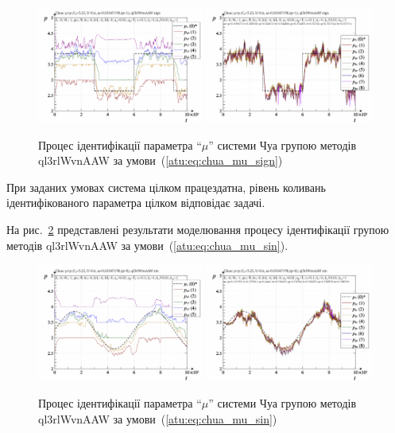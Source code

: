 \begin{figure}[htb!]
  \centerline{
    \includegraphics[width=0.49\textwidth]{p/cha/chua/ql3rlWvnAAW/chua_id-p_t_pi_ql3rlWvnAAW_sign.png}
    \hfill
    \includegraphics[width=0.49\textwidth]{p/cha/chua/ql3rlWvnAAW/chua_id-p_t_p_ql3rlWvnAAW_sign.png}
  }
\caption{Процес ідентифікації параметра ``$\mu$'' системи Чуа групою методів ql3rlWvnAAW за умови~(\ref{atu:eq:chua_mu_sign})}
  \label{atu:f:chua_id_ql3rlWvnAAW_sign}
\end{figure}

При заданих умовах система цілком працездатна, рівень коливань
ідентифікованого параметра цілком відповідає задачі.

На рис.~\ref{atu:f:chua_id_ql3rlWvnAAW_sin} представлені результати
моделювання процесу ідентифікації групою методів ql3rlWvnAAW за
умови~(\ref{atu:eq:chua_mu_sin}).

\begin{figure}[htb!]
  \centerline{
    \includegraphics[width=0.49\textwidth]{p/cha/chua/ql3rlWvnAAW/chua_id-p_t_pi_ql3rlWvnAAW_sin.png}
    \hfill
    \includegraphics[width=0.49\textwidth]{p/cha/chua/ql3rlWvnAAW/chua_id-p_t_p_ql3rlWvnAAW_sin.png}
  }
\caption{Процес ідентифікації параметра ``$\mu$'' системи Чуа групою методів ql3rlWvnAAW за умови~(\ref{atu:eq:chua_mu_sin})}
\label{atu:f:chua_id_ql3rlWvnAAW_sin}
\end{figure}

